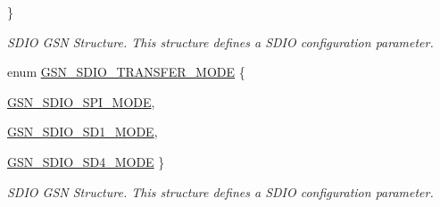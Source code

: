 \begin{DoxyCompactItemize}
 \}
\begin{DoxyCompactList}\small\item\em SDIO GSN Structure. This structure defines a SDIO configuration parameter. \end{DoxyCompactList}\item 
enum \hyperlink{a00653_ga614d231648d595050ca4379ce506d6e0}{GSN\_\-SDIO\_\-TRANSFER\_\-MODE} \{ \par
\hyperlink{a00653_gga614d231648d595050ca4379ce506d6e0a117ced33b4b07570e34d3e051ae8528d}{GSN\_\-SDIO\_\-SPI\_\-MODE}, 
\par
\hyperlink{a00653_gga614d231648d595050ca4379ce506d6e0acfd2d43aabc0697963620c4c0b7268db}{GSN\_\-SDIO\_\-SD1\_\-MODE}, 
\par
\hyperlink{a00653_gga614d231648d595050ca4379ce506d6e0a811c963889d54272379b13160b604038}{GSN\_\-SDIO\_\-SD4\_\-MODE}
 \}
\begin{DoxyCompactList}\small\item\em SDIO GSN Structure. This structure defines a SDIO configuration parameter. \end{DoxyCompactList}\end{DoxyCompactItemize}

